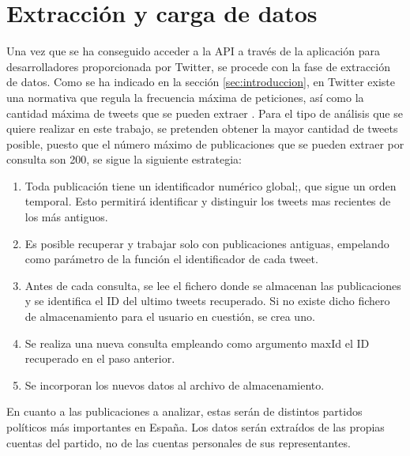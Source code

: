 

\section{Extracción y carga de datos}
\label{sec:extraccion-carga-datos}

Una vez que se ha conseguido acceder a la API a través de la aplicación para desarrolladores proporcionada por Twitter, se procede 
con la fase de extracción de datos. Como se ha indicado en la sección \ref{sec:introduccion}, en Twitter existe una normativa 
que regula la frecuencia máxima de peticiones, así como la cantidad máxima de tweets que se pueden extraer \cite{rate_limit}. Para 
el tipo de análisis que se quiere realizar en este trabajo, se pretenden obtener la mayor cantidad de tweets posible, puesto que el 
número máximo de publicaciones que se pueden extraer por consulta son 200, se sigue la siguiente estrategia:

\begin{enumerate}
	\item Toda publicación  tiene un identificador numérico global;, que sigue un orden temporal. Esto permitirá identificar y distinguir 
	los tweets mas recientes de los más antiguos.

	\item Es posible recuperar y trabajar solo con publicaciones antiguas, empelando como parámetro de la función el identificador de 
	cada tweet.

	\item Antes de cada consulta, se lee el fichero donde se almacenan las publicaciones y se identifica el ID del ultimo tweets
	recuperado. Si no existe dicho fichero de almacenamiento para el usuario en cuestión, se crea uno.

	\item Se realiza una nueva consulta empleando como argumento maxId el ID recuperado en el paso anterior.

	\item Se incorporan los nuevos datos al archivo de almacenamiento.
\end{enumerate} 

En cuanto a las publicaciones a analizar, estas serán de distintos partidos políticos más importantes en España. Los datos serán extraídos 
de las propias cuentas del partido, no de las cuentas personales de sus representantes.





